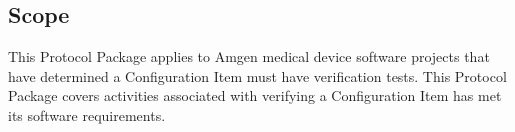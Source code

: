 \subsection{Scope}
This Protocol Package applies to Amgen medical device software projects that
have determined a Configuration Item must have verification tests.  This
Protocol Package covers activities associated with verifying a Configuration
Item has met its software requirements.
